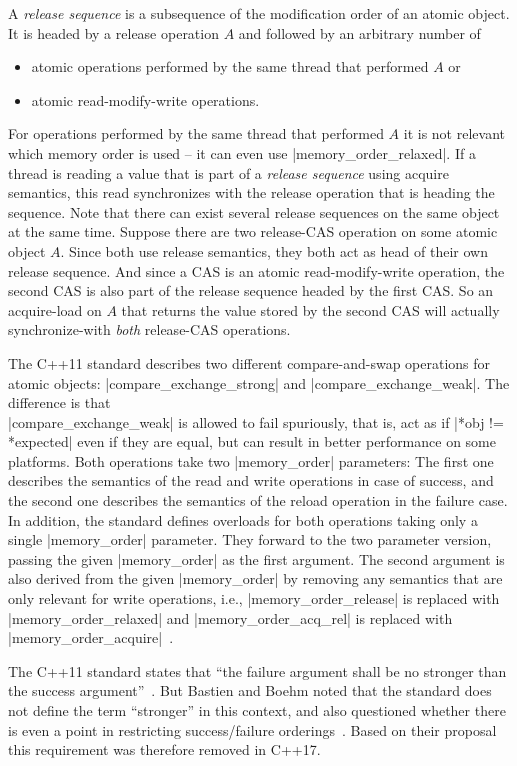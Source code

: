 \documentclass[a4paper,12pt,notitlepage,twoside,openright]{article}
\begin{document}
A \emph{release sequence} is a subsequence of the modification order
of an atomic object. It is headed by a release operation $A$ and
followed by an arbitrary number of
\begin{itemize}
	\item atomic operations performed by the same thread that
          performed $A$ or
	\item atomic read-modify-write operations.
\end{itemize}
For operations performed by the same thread that performed $A$ it is
not relevant which memory order is used -- it can even use
|memory_order_relaxed|. If a thread is reading a value that is part of
a \emph{release sequence} using acquire semantics, this read
synchronizes with the release operation that is heading the sequence.
Note that there can exist several release sequences on the same object
at the same time. Suppose there are two release-CAS operation on some
atomic object $A$. Since both use release semantics, they both act as
head of their own release sequence. And since a CAS is an atomic
read-modify-write operation, the second CAS is also part of the
release sequence headed by the first CAS. So an acquire-load on $A$
that returns the value stored by the second CAS will actually
synchronize-with \emph{both} release-CAS operations.

The C++11 standard describes two different compare-and-swap operations
for atomic objects: |compare_exchange_strong| and
|compare_exchange_weak|. The difference is that\\
|compare_exchange_weak| is allowed to fail spuriously, that is, act as
if |*obj != *expected| even if they are equal, but can result in
better performance on some platforms. Both operations take two
|memory_order| parameters: The first one describes the semantics of
the read and write operations in case of success, and the second one
describes the semantics of the reload operation in the failure case.
In addition, the standard defines overloads for both operations taking
only a single |memory_order| parameter. They forward to the two
parameter version, passing the given |memory_order| as the first
argument. The second argument is also derived from the given
|memory_order| by removing any semantics that are only relevant for
write operations, i.e., |memory_order_release| is replaced with
|memory_order_relaxed| and |memory_order_acq_rel| is replaced with
|memory_order_acquire|~\cite[29.6.5.21, p. 1113]{c++11_standard}.

The C++11 standard states that ``the failure argument shall be no
stronger than the success argument''~\cite[29.6.5.20,
  p. 1113]{c++11_standard}.  But Bastien and Boehm noted that the
standard does not define the term ``stronger'' in this context, and
also questioned whether there is even a point in restricting
success/failure orderings~\cite{Bastien:2016:fail-or-succeed}. Based
on their proposal this requirement was therefore removed in C++17.
\end{document}
